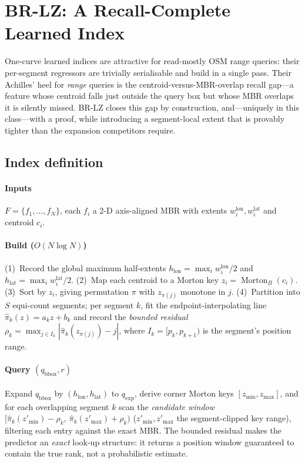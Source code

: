 \section{BR-LZ: A Recall-Complete Learned Index}\label{sec:brlz}

One-curve learned indices are attractive for read-mostly OSM range
queries: their per-segment regressors are trivially serialisable and
build in a single pass. Their Achilles' heel for \emph{range} queries is
the centroid-versus-MBR-overlap recall gap---a feature whose centroid
falls just outside the query box but whose MBR overlaps it is silently
missed. BR-LZ closes this gap by construction, and---uniquely in this
class---with a proof, while introducing a segment-local extent that is
provably tighter than the expansion competitors require.

\subsection{Index definition}
\paragraph*{Inputs} $F=\{f_1,\dots,f_N\}$, each $f_i$ a 2-D axis-aligned
MBR with extents $w_i^{\mathrm{lon}},w_i^{\mathrm{lat}}$ and centroid
$c_i$.

\paragraph*{Build ($O(N\log N)$)}
(1)~Record the global maximum half-extents
$h_{\mathrm{lon}}=\max_i w_i^{\mathrm{lon}}/2$ and
$h_{\mathrm{lat}}=\max_i w_i^{\mathrm{lat}}/2$.
(2)~Map each centroid to a Morton key
$z_i=\operatorname{Morton}_B(c_i)$.
(3)~Sort by $z_i$, giving permutation $\pi$ with $z_{\pi(j)}$ monotone in
$j$.
(4)~Partition into $S$ equi-count segments; per segment $k$, fit the
endpoint-interpolating line $\hat\pi_k(z)=a_kz+b_k$ and record the
\emph{bounded residual}
$\rho_k=\max_{j\in I_k}|\hat\pi_k(z_{\pi(j)})-j|$, where
$I_k=[p_k,p_{k+1})$ is the segment's position range.

\paragraph*{Query $(q_{\mathrm{bbox}},r)$}
Expand $q_{\mathrm{bbox}}$ by $(h_{\mathrm{lon}},h_{\mathrm{lat}})$ to
$q_{\mathrm{exp}}$, derive corner Morton keys $[z_{\min},z_{\max}]$, and
for each overlapping segment $k$ scan the \emph{candidate window}
$[\hat\pi_k(z'_{\min})-\rho_k,\ \hat\pi_k(z'_{\max})+\rho_k)$
($z'_{\min},z'_{\max}$ the segment-clipped key range), filtering each
entry against the exact MBR. The bounded residual makes the predictor an
\emph{exact} look-up structure: it returns a position window guaranteed to
contain the true rank, not a probabilistic estimate.

